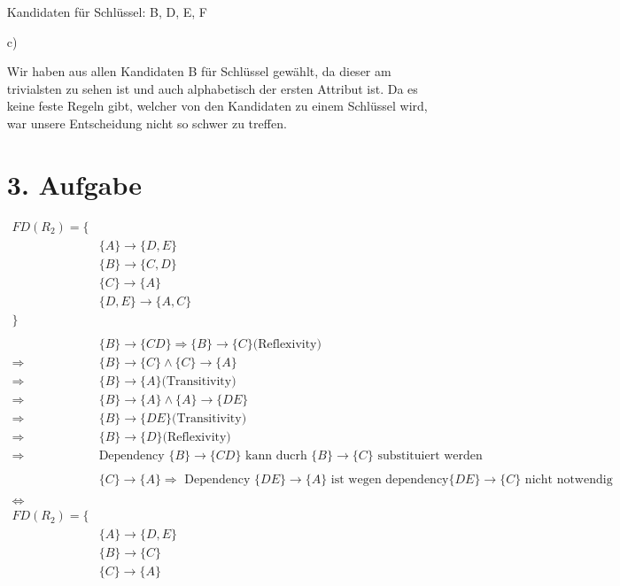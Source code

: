 \begin{itemize}
Kandidaten für Schlüssel: B, D, E, F

\item[c)]

Wir haben aus allen Kandidaten B für Schlüssel gewählt, da dieser am trivialsten zu sehen ist und auch alphabetisch der ersten Attribut ist. Da es keine feste Regeln gibt, welcher von den Kandidaten zu einem Schlüssel wird, war unsere Entscheidung nicht so schwer zu treffen.

\section*{3. Aufgabe}

\begin{align*}
FD(R_2) = \{ & \\
& \{A\} \rightarrow \{D, E\} \\
& \{B\} \rightarrow \{C, D\} \\
& \{C\} \rightarrow \{A\} \\
& \{D, E\} \rightarrow \{A, C\} \\
\} & \\ \\
%
& \{B\} \rightarrow \{CD\} \Rightarrow \{B\} \rightarrow \{C\} \text{(Reflexivity)} \\
\Rightarrow & \{B\} \rightarrow \{C\} \land \{C\} \rightarrow \{A\} \\
\Rightarrow & \{B\} \rightarrow \{A\} \text{(Transitivity)} \\
\Rightarrow & \{B\} \rightarrow \{A\} \land \{A\} \rightarrow \{DE\} \\
\Rightarrow & \{B\} \rightarrow \{DE\} \text{(Transitivity)} \\
\Rightarrow & \{B\} \rightarrow \{D\} \text{(Reflexivity)} \\
\Rightarrow & \text{Dependency } \{B\} \rightarrow \{CD\} \text{ kann ducrh } \{B\} \rightarrow \{C\} \text{ substituiert werden} \\ \\
%
& \{C\} \rightarrow \{A\} \Rightarrow \text{ Dependency } \{DE\} \rightarrow \{A\} \text{ ist wegen dependency} \{DE\} \rightarrow \{C\} \text{ nicht notwendig} \\ \\
%
\Leftrightarrow \\
FD(R_2) = \{ & \\
& \{A\} \rightarrow \{D, E\} \\
& \{B\} \rightarrow \{C\} \\
& \{C\} \rightarrow \{A\} \\

\end{align*}
\end{itemize}
